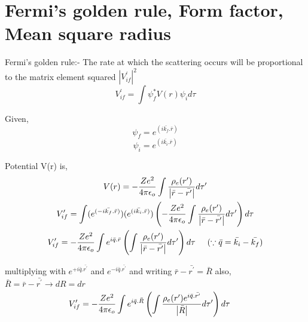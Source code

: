 \documentclass[11pt, a4paper]{article}
\begin{document}
 
    



%
\tableofcontents

\clearpage
    
\section{Fermi's golden rule, Form factor, Mean square radius}      
\label{sec:1} 
Fermi's golden rule:- The rate at which the scattering occurs will be proportional to the matrix element squared \(\left\vert V_{if}^\prime  \right\vert^2 \) 
\begin{equation}
    V_{if} ^\prime  = \int \psi^*_{f} V(r) \psi_{i} d\tau
\end{equation}
    

Given,
\[
    \psi_{f} = e^ {(i \bar{k_f}.\bar{r})}\]
    \[\psi_{i} = e^ {(i \bar{k_i}.\bar{r}) }\]

Potential V(r) is,
\begin{gather}
    V(r) = -\frac{Ze^2}{4 \pi \epsilon_{o}}\int \frac{\rho_e(r^\prime )}{\left\vert \bar{r}-\bar{r^\prime } \right\vert }d\tau^\prime\\
    V_{if} ^\prime = \int   (e^ {(-i \bar{k_f}.\bar{r})})(e^ {(i \bar{k_i}.\bar{r}) })\left(-\frac{Ze^2}{4 \pi \epsilon_{o}}\int \frac{\rho_e(r^\prime )}{\left\vert \bar{r}-\bar{r^\prime } \right\vert }d\tau^\prime\right) d\tau\\
    V_{if}^\prime = -\frac{Ze^2}{4 \pi \epsilon_{o}} \int e^{i\bar{q}.\bar{r}}\left(\int\frac{\rho_e(r^\prime )}{\left\vert \bar{r}-\bar{r^\prime } \right\vert }d\tau^\prime\right)d\tau \hspace{.5cm} (\because \bar{q} = \bar{k_i}-\bar{k_{f}})
\end{gather}
    


multiplying with \(e^{+i\bar{q}.\bar{r^\prime }}\) and \(e^{-i\bar{q}.\bar{r^\prime }}\) and writing \(\bar{r}-\bar{r^\prime } = \bar{R}\) also, \(\bar{R} = \bar{r}-\bar{r^\prime }  \to  dR = dr\) 
\begin{gather}
    V_{if}^\prime = -\frac{Ze^2}{4 \pi \epsilon_{o}} \int e^{i\bar{q}.\bar{R}}\left(\int\frac{\rho_e(r^\prime )e^{i \bar{q}.\bar{r^\prime }}}{\left\vert \bar{R} \right\vert }d\tau^\prime\right)d\tau \hspace{.5cm} 
\end{gather}
   
\end{document}
